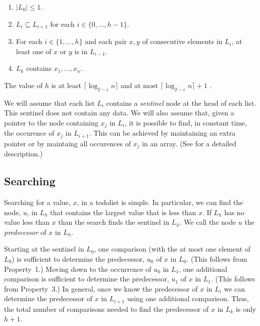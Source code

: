\documentclass[lotsofwhite]{patmorin}
\begin{document}
\begin{enumerate}
\item $|L_0| \le 1$.
\item $L_i\subseteq L_{i+1}$ for each $i\in\{0,\ldots,h-1\}$.
\item For each $i\in\{1,\ldots,h\}$ and each pair $x,y$ of consecutive elements in $L_i$, at least one of $x$ or $y$ is in $L_{i-1}$.
\item $L_k$ contains $x_1,\ldots,x_n$.
\end{enumerate}

The value of $h$ is at least $\lceil \log_{2-\varepsilon} n\rceil$ and at most
$\lceil \log_{2-\varepsilon} n\rceil+1$ .

We will assume that each list $L_i$ contains a \emph{sentinel} node
at the head of each list. This sentinel does not contain any data.
We will also assume that, given a pointer to the node containing $x_j$
in $L_i$, it is possible to find, in constant time, the occurence of $x_j$
in $L_{i+1}$.  This can be achieved by maintaining an extra pointer or by
maintaing all occurences of $x_j$ in an array. (See 
for a detailed description.)

\subsection{Searching}

Searching for a value, $x$, in a todolist is simple. In particular, we
can find the node, $u$, in $L_h$ that contains the largest value that
is less than $x$. If $L_h$ has no value less than $x$ than the search
finds the sentinel in $L_h$.  We call the node $u$ the \emph{predecessor}
of $x$ in $L_h$.

Starting at the sentinel in $L_0$, one comparison (with the at most one
element of $L_0$) is sufficient to determine the predecessor, $u_0$ of $x$
in $L_0$. (This follows from Property~1.)  Moving down to the occurrence
of $u_0$ in $L_1$, one additional comparison is sufficient to determine
the predecessor, $u_1$ of $x$ in $L_1$. (This follows from Property~3.)
In general, once we know the predecessor of $x$ in $L_i$ we can determine
the predecessor of $x$ in $L_{i+1}$ using one additional comparison. Thus,
the total number of comparisons needed to find the predecessor of $x$
in $L_k$ is only $h+1$.

\vspace{1ex}
\begin{algorithmic}
    \ENDIF
  \ENDFOR
\end{algorithmic}
\end{document}
